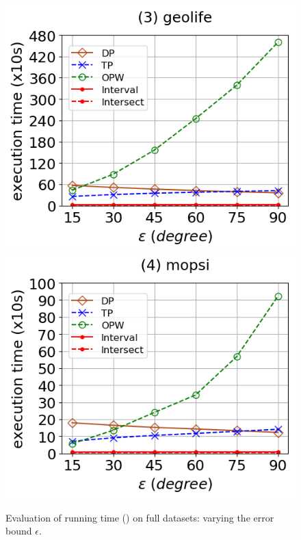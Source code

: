 \begin{figure}[tb!]
	\includegraphics[scale=0.315]{Figures/Exp-DAD-time-epsilon-geolife.png}	\hspace{1ex}
	\includegraphics[scale=0.315]{Figures/Exp-DAD-time-epsilon-mopsi.png}		
	\vspace{-3ex}
	\caption{\small Evaluation of running time (\dad) on full datasets: varying the error bound $\epsilon$.}\label{fig:time-epsilon-dad}
	\vspace{-2ex}
\end{figure}

